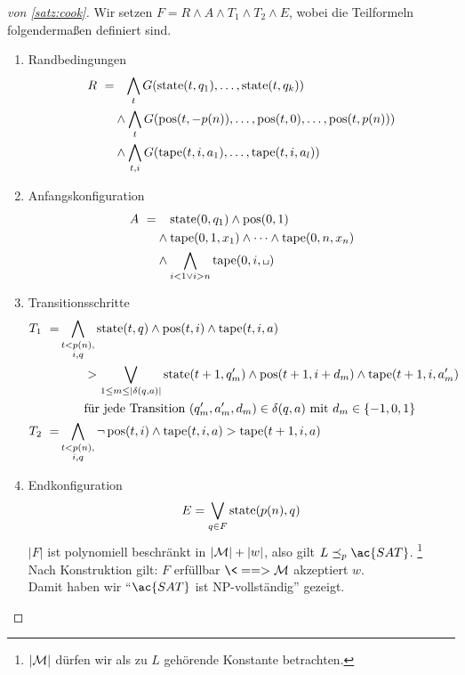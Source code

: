\begin{proof}[von \autoref{satz:cook}]
	Wir setzen $F = R \land A\land T_1 \land T_2 \land E$, wobei die Teilformeln folgendermaßen definiert sind.
	\begin{enumerate}
	\item Randbedingungen
		\begin{align*}
			R\ =&\phantom{\land}\, \bigwedge_t G(\operatorname{state}(t,q_1),\dots,\operatorname{state}(t,q_k))\\
			& \land \bigwedge_t G(\operatorname{pos}(t,-p(n)),\dots,\operatorname{pos}(t,0),\dots,\operatorname{pos}(t,p(n)))\\
			& \land \bigwedge_{t,i} G(\operatorname{tape}(t,i,a_1),\dots,\operatorname{tape}(t,i,a_l))
		\end{align*}
	\item Anfangskonfiguration
		\begin{align*}
			A\ =&\phantom{\land}\; \state(0,q_1)\land \pos(0,1)\\
			&\land\tape(0,1,x_1)\land\dots\land\tape(0,n,x_n)\\
			&\land\bigwedge_{i< 1 \lor i > n} \tape(0,i,\blank)
		\end{align*}
	\item Transitionsschritte
	\begin{align*}
		T_1\ =& \bigwedge_{\substack{t < p(n),\\i,q}} \operatorname{state}(t,q)\land \operatorname{pos}(t,i) \land \operatorname{tape}(t,i,a)\\
		&\qquad \-> \bigvee_{1 \leq m \leq |\delta(q,a)|} \operatorname{state}(t+1,q_m')\land \operatorname{pos}(t+1,i+d_m) \land \operatorname{tape}(t+1,i,a_m')\\
		&\qquad \text{für jede Transition } (q_m',a_m',d_m) \in \delta(q,a) \text{ mit } d_m\in\{-1,0,1\}\\
		T_2\ =& \bigwedge_{\substack{t < p(n),\\i,q}} \neg \operatorname{pos}(t,i)\land \operatorname{tape}(t,i,a) \-> \operatorname{tape}(t+1,i,a)
	\end{align*}
	\item Endkonfiguration%
		\[ E = \bigvee_{q\in F} \operatorname{state}(p(n),q) \]
		$|F|$ ist polynomiell beschränkt in $|\mathcal{M}|+|w|$, also gilt $L\preceq_p \ac{SAT}$.%
		\footnote{$|\mathcal{M}|$ dürfen wir als zu $L$ gehörende Konstante betrachten.}\\
		Nach Konstruktion gilt: $F$ erfüllbar $\<==> \M$ akzeptiert $w$.\\
		Damit haben wir "`$\ac{SAT}$ ist \ac{NP}-vollständig"' gezeigt.
		\qedhere
	\end{enumerate}
\end{proof}

